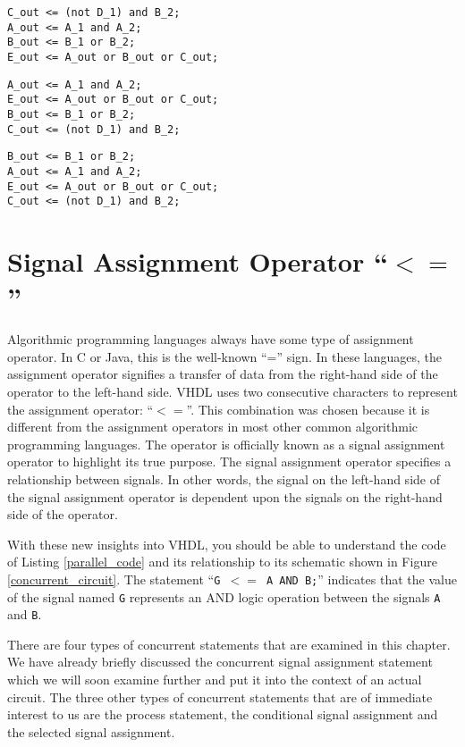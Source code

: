 \noindent
\begin{minipage}{0.99\linewidth}
\begin{lstlisting}[label=parallel_code_2, caption=Equivalent VHDL code for the circuit of Figure 4.1. ]
C_out <= (not D_1) and B_2; 
A_out <= A_1 and A_2;   
B_out <= B_1 or B_2; 
E_out <= A_out or B_out or C_out;
\end{lstlisting}
\begin{lstlisting}[label=parallel_code_3, caption=Equivalent VHDL code for the circuit of Figure 4.1.]
A_out <= A_1 and A_2;   
E_out <= A_out or B_out or C_out;
B_out <= B_1 or B_2; 
C_out <= (not D_1) and B_2; 
\end{lstlisting}
\begin{lstlisting}[label=parallel_code_4, caption=Equivalent VHDL code for the circuit of Figure 4.1.]
B_out <= B_1 or B_2; 
A_out <= A_1 and A_2;   
E_out <= A_out or B_out or C_out;
C_out <= (not D_1) and B_2; 
\end{lstlisting}
\end{minipage}

\section{Signal Assignment Operator ``$<=$''}
Algorithmic programming languages always have some type of assignment operator. In C or Java, this is the well-known ``='' sign. In these languages, the assignment operator signifies a transfer of data from the right-hand side of the operator to the left-hand side. VHDL uses two consecutive characters to represent the assignment operator: ``\texttt{$<=$}''. This combination was chosen because it is different from the assignment operators in most other common algorithmic programming languages. The operator is officially known as a signal assignment operator to highlight its true purpose. The signal assignment operator specifies a relationship between signals. In other words, the signal on the left-hand side of the signal assignment operator is dependent upon the signals on the right-hand side of the operator.

With these new insights into VHDL, you should be able to understand the code of Listing \ref{parallel_code} and its relationship to its schematic shown in Figure \ref{concurrent_circuit}. The statement ``\texttt{G~$<=$~A~AND~B;}'' indicates that the value of the signal named \texttt{G} represents an AND logic operation between the signals \texttt{A} and \texttt{B}.

There are four types of concurrent statements that are examined in this chapter. We have already briefly discussed the concurrent signal assignment statement which we will soon examine further and put it into the context of an actual circuit. The three other types of concurrent statements that are of immediate interest to us are the process statement, the conditional signal assignment and the selected signal assignment.

